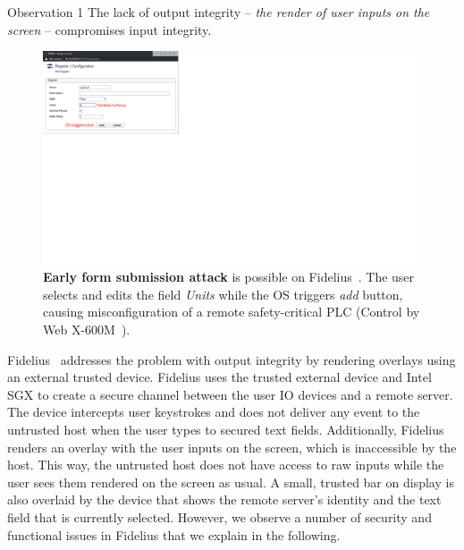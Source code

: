 \begin{mybox}[colback=white]{Observation 1}
The lack of output integrity -- \emph{the render of user inputs on the screen} -- compromises input integrity.
\end{mybox}

\begin{figure}[t]
\centering
\includegraphics[trim={0 11.5cm 21.8cm 0}, clip, width=0.8\linewidth]{chapters/ProtectIOn/images/earlyFormSubmission.pdf}
\caption[Early form submission attacks]{\textbf{Early form submission attack} is possible on Fidelius~\cite{Fidelius}. The user selects and edits the field \emph{Units} while the OS triggers \emph{add} button, causing misconfiguration of a remote safety-critical PLC (Control by Web X-600M~\cite{controlbyweb}).}
\label{fig:clickJack}
\centering 
\end{figure}

Fidelius~\cite{Fidelius} addresses the problem with output integrity by rendering overlays using an external trusted device. Fidelius uses the trusted external device and Intel SGX to create a secure channel between the user IO devices and a remote server. The device intercepts user keystrokes and does not deliver any event to the untrusted host when the user types to secured text fields. Additionally, Fidelius renders an overlay with the user inputs on the screen, which is inaccessible by the host. This way, the untrusted host does not have access to raw inputs while the user sees them rendered on the screen as usual.
A small, trusted bar on display is also overlaid by the device that shows the remote server's identity and the text field that is currently selected. 
However, we observe a number of security and functional issues in Fidelius that we explain in the following. 

